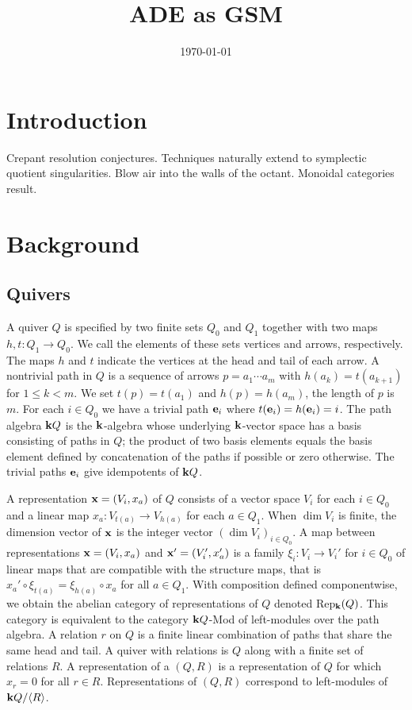 \documentclass{amsart}
\title{ADE as GSM}
\date{\today}
\theoremstyle{definition}
\begin{document}
\maketitle

\section{Introduction}
Crepant resolution conjectures.
Techniques naturally extend to symplectic quotient singularities.
Blow air into the walls of the octant.
Monoidal categories result.



\section{Background}\label{sc:background}

\subsection{Quivers}
A quiver $Q$ is specified by two finite sets $Q_0$ and $Q_1$ together with two maps $h, t \colon Q_1 \rightarrow Q_0$. We call the elements of these sets vertices and arrows, respectively.  The maps $h$ and $t$ indicate the vertices at the head and tail of each arrow.
A nontrivial path in $Q$ is a sequence of arrows $p = a_1 \dotsb a_m$ with $h(a_{k}) = t(a_{k+1})$ for $1 \leq k < m$.  We set $t(p) = t(a_{1})$ and $h(p)= h(a_m)$, the length of $p$ is $m$.  
For each $i \in Q_0$ we have a trivial path $\mathbf{e}_i$ where $t(\mathbf{e}_i) = h(\mathbf{e}_i) = i$.  
The path algebra $\mathbf{k} Q$ is the $\mathbf{k}$-algebra whose underlying $\mathbf{k}$-vector space has a basis consisting of paths in $Q$; the product of two basis elements equals the basis element defined by concatenation of the paths if possible or zero otherwise.
The trivial paths $\mathbf{e}_i$ give idempotents of $\mathbf{k} Q$.

A representation $\mathbf{x} = (V_i, x_a)$ of $Q$ consists of a vector space $V_i$ for each $i \in Q_0$ and a linear map $x_a \colon V_{t(a)} \rightarrow V_{h(a)}$ for each $a \in Q_1$. 
When $\dim V_i$ is finite, the dimension vector of $\mathbf{x}$ is the integer vector $(\dim V_{i})_{i\in Q_0}$.  
A map between representations $\mathbf{x} = (V_i, x_a)$ and $\mathbf{x}' = (V_i', x_a')$ is a family $\xi_{i} \colon V_i^{\,} \rightarrow V_i'$ for $i \in Q_0$ of linear maps that are compatible with the structure maps, that is $x_a' \circ\xi_{t(a)} = \xi_{h(a)} \circ x_a$ for all $a \in Q_1$.  
With composition defined componentwise, we obtain the abelian category of representations of $Q$ denoted Rep$_{\mathbf{k}}(Q)$. 
This category is equivalent to the category $\mathbf{k} Q$-Mod of left-modules over the path algebra.
A relation $r$ on $Q$ is a finite linear combination of paths that share the same head and tail.
A quiver with relations is $Q$ along with a finite set of relations $R$.
A representation of a $(Q,R)$ is a representation of $Q$ for which $x_r=0$ for all $r\in R$.
Representations of $(Q,R)$ correspond to left-modules of $\mathbf{k} Q/ \langle R \rangle$.
\end{document}
